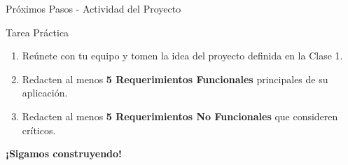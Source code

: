 \documentclass{beamer}
\begin{document}
\begin{frame}{Próximos Pasos - Actividad del Proyecto}
    \begin{block}{Tarea Práctica}
        \begin{enumerate}
            \item Reúnete con tu equipo y tomen la idea del proyecto definida en la Clase 1.
            \item Redacten al menos \textbf{5 Requerimientos Funcionales} principales de su aplicación.
            \item Redacten al menos \textbf{5 Requerimientos No Funcionales} que consideren críticos.
        \end{enumerate}
    \end{block}
    \vspace{0.5cm}
    \begin{center}
        \Large \textbf{¡Sigamos construyendo!}
    \end{center}
\end{frame}
\end{document}
